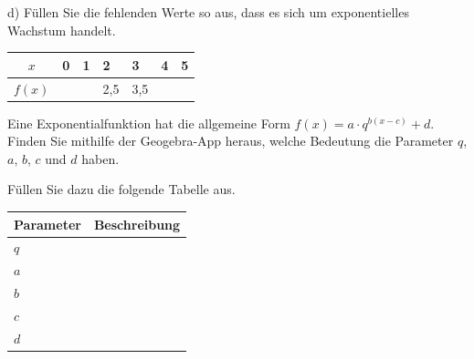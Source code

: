 \documentclass[11pt, a4paper, oneside]{article}
\begin{document}
	\checkered[6cm]
	
	d) Füllen Sie die fehlenden Werte so aus, dass es sich um exponentielles Wachstum handelt.
	
	\begin{table}[ht]
		\centering
		\begin{tabularx}{.5\textwidth}{|c||X|X|X|X|X|X|}
			\hline
			$x$ & 0 & 1 & 2 & 3 & 4 & 5\\
			\hline
			$f(x)$ &&& 2,5 & 3,5 &&\\
			\hline
		\end{tabularx}
	\end{table}
	
	
%	
%	
%	
%	
%	
%	
%	
	
	
	\begin{figure}
		\vspace{-\baselineskip}
	\end{figure}
	
	Eine Exponentialfunktion hat die allgemeine Form $f(x) = a \cdot q^{b(x-c)} + d$.
	Finden Sie mithilfe der Geogebra-App heraus, welche Bedeutung die Parameter $q$, $a$, $b$, $c$ und $d$ haben.
	
	Füllen Sie dazu die folgende Tabelle aus.
	
	\vspace{1cm}
	
	\begin{table}[!ht]
		\begin{tabularx}{\textwidth}{|l|X|}
			\hline
			\textbf{Parameter} & \textbf{Beschreibung}\\
			\hline
			\hline
			$q$&\\[1.5cm]
			\hline
			$a$&\\[1.5cm]
			\hline
			$b$&\\[1.5cm]
			\hline
			$c$&\\[1.5cm]
			\hline
			$d$&\\[1.5cm]
			\hline
		\end{tabularx}
	\end{table}
	
\end{document}
